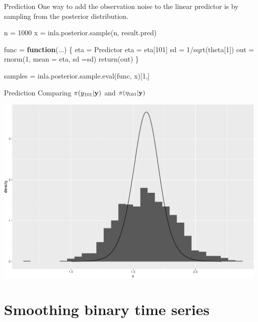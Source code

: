 \documentclass[
  ignorenonframetext,
]{beamer}
\newenvironment{Shaded}{\begin{snugshade}}{\end{snugshade}}
\newcommand{\AttributeTok}[1]{\textcolor[rgb]{0.77,0.63,0.00}{#1}}
\newcommand{\ControlFlowTok}[1]{\textcolor[rgb]{0.13,0.29,0.53}{\textbf{#1}}}
\newcommand{\DecValTok}[1]{\textcolor[rgb]{0.00,0.00,0.81}{#1}}
\newcommand{\FunctionTok}[1]{\textcolor[rgb]{0.00,0.00,0.00}{#1}}
\newcommand{\NormalTok}[1]{#1}
\newcommand{\OtherTok}[1]{\textcolor[rgb]{0.56,0.35,0.01}{#1}}
\newcommand{\SpecialCharTok}[1]{\textcolor[rgb]{0.00,0.00,0.00}{#1}}
\begin{document}
\begin{frame}[fragile]{Prediction}
\protect\hypertarget{prediction-4}{}
One way to add the observation noise to the linear predictor is by
sampling from the posterior distribution.

\small

\begin{Shaded}
\begin{Highlighting}[]
\NormalTok{n }\OtherTok{=} \DecValTok{1000}
\NormalTok{x }\OtherTok{=} \FunctionTok{inla.posterior.sample}\NormalTok{(n, result.pred)}

\NormalTok{func }\OtherTok{=} \ControlFlowTok{function}\NormalTok{(...)}
\NormalTok{\{}
\NormalTok{  eta }\OtherTok{=}\NormalTok{ Predictor}
\NormalTok{  eta }\OtherTok{=}\NormalTok{ eta[}\DecValTok{101}\NormalTok{]}
\NormalTok{  sd }\OtherTok{=} \DecValTok{1}\SpecialCharTok{/}\FunctionTok{sqrt}\NormalTok{(theta[}\DecValTok{1}\NormalTok{])}
\NormalTok{  out }\OtherTok{=} \FunctionTok{rnorm}\NormalTok{(}\DecValTok{1}\NormalTok{, }\AttributeTok{mean =}\NormalTok{ eta, }\AttributeTok{sd =}\NormalTok{sd)}
  \FunctionTok{return}\NormalTok{(out)}
\NormalTok{\}}

\NormalTok{samples }\OtherTok{=} \FunctionTok{inla.posterior.sample.eval}\NormalTok{(func, x)[}\DecValTok{1}\NormalTok{,]}
\end{Highlighting}
\end{Shaded}
\end{frame}

\begin{frame}{Prediction}
\protect\hypertarget{prediction-5}{}
Comparing \(\pi(y_{101}|\bf{y})\) and \(\pi(\eta_{101}|\bf{y})\)

\begin{center}\includegraphics[width=0.6\linewidth]{Part3_RINLA_files/figure-beamer/unnamed-chunk-36-1} \end{center}
\normalsize
\end{frame}

\hypertarget{smoothing-binary-time-series}{%
\section{Smoothing binary time
series}\label{smoothing-binary-time-series}}
\end{document}
